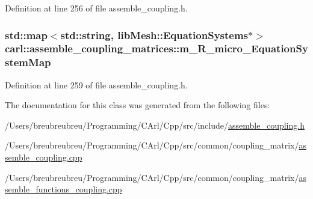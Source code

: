Definition at line 256 of file assemble\+\_\+coupling.\+h.

\hypertarget{classcarl_1_1assemble__coupling__matrices_a5b7c4f9307a9611926dc1ccf8bb33d4b}{}
\subsubsection[{m\+\_\+\+R\+\_\+micro\+\_\+\+Equation\+System\+Map}]{\setlength{\rightskip}{0pt plus 5cm}std\+::map$<$std\+::string, lib\+Mesh\+::\+Equation\+Systems$\ast$$>$ carl\+::assemble\+\_\+coupling\+\_\+matrices\+::m\+\_\+\+R\+\_\+micro\+\_\+\+Equation\+System\+Map\hspace{0.3cm}{\ttfamily [protected]}}\label{classcarl_1_1assemble__coupling__matrices_a5b7c4f9307a9611926dc1ccf8bb33d4b}


Definition at line 259 of file assemble\+\_\+coupling.\+h.



The documentation for this class was generated from the following files\+:\begin{DoxyCompactItemize}
\item 
/\+Users/breubreubreu/\+Programming/\+C\+Arl/\+Cpp/src/include/\hyperlink{assemble__coupling_8h}{assemble\+\_\+coupling.\+h}\item 
/\+Users/breubreubreu/\+Programming/\+C\+Arl/\+Cpp/src/common/coupling\+\_\+matrix/\hyperlink{assemble__coupling_8cpp}{assemble\+\_\+coupling.\+cpp}\item 
/\+Users/breubreubreu/\+Programming/\+C\+Arl/\+Cpp/src/common/coupling\+\_\+matrix/\hyperlink{assemble__functions__coupling_8cpp}{assemble\+\_\+functions\+\_\+coupling.\+cpp}\end{DoxyCompactItemize}
